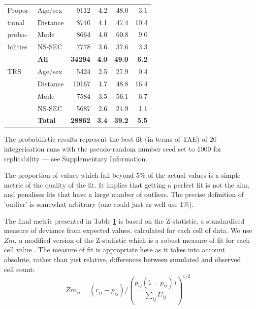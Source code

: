 \documentclass[a4paper, 11pt, twoside]{Thesis}
\begin{document}
\begin{table}[]
{\begin{center}
\begin{tabular}{llrrrr}
Propor- & Age/sex & 9112 & 4.2 & 48.0 & 3.1 \\
tional & Distance & 8740 & 4.1 & 47.4 & 10.4 \\
proba- & Mode & 8664 & 4.0 & 60.8 & 9.0 \\
bilities & NS-SEC & 7778 & 3.6 & 37.6 & 3.3 \\
 & \textbf{All} & \textbf{34294} & \textbf{4.0} & \textbf{49.0} & \textbf{6.2}
\\
\midrule
TRS &Age/sex & 5424 & 2.5 & 27.9 & 0.4 \\
 & Distance & 10167 & 4.7 & 48.8 & 16.4 \\
 & Mode & 7584 & 3.5 & 56.1 & 6.7 \\
 & NS-SEC & 5687 & 2.6 & 24.9 & 1.1 \\
 & \textbf{Total} & \textbf{28862} & \textbf{3.4} & \textbf{39.2} & \textbf{5.5}
\\
\bottomrule
\end{tabular}
\end{center}
}
\label{acc-results}
\begin{tablenotes}
      \footnotesize
      \item * The probabilistic
results represent the best fit (in terms of TAE) of 20 integerisation runs
with the pseudo-random number seed set to 1000 for replicability --- see
Supplementary Information.
    \end{tablenotes}
\end{table}

The proportion of values which fall beyond 5\% of the actual values is a simple
metric of the quality of the fit. It implies that getting a perfect fit is not
the aim, and penalises fits that have a large number of outliers. The precise
definition of 'outlier' is somewhat arbitrary (one could just as well use 1\%).

The final metric presented in Table \ref{acc-results}
is based on the Z-statistic, a standardised measure of
deviance from expected values, calculated for each cell of data. We use $Zm$, a
modified version of the Z-statistic which is a robust measure of fit for each
cell value \citet{Williamson1998}. The measure of
fit is appropriate here as it takes into account absolute, rather than just
relative, differences between simulated and observed cell count:
\begin{equation}
 Zm_{ij} = (r_{ij} - p_{ij}) \Bigg/ \left(\frac{p_{ij}(1 -
p_{ij}))}{\sum\limits_{ij}U_{ij}}\right)^{1/2}
\end{equation}
\end{document}
